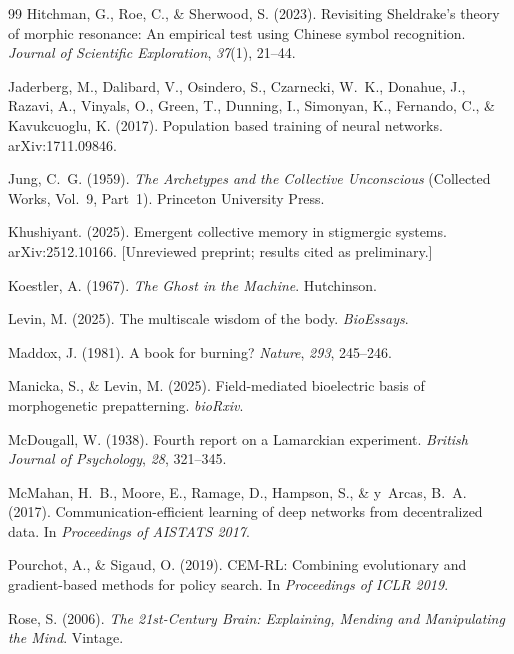 \documentclass[twoside,11pt]{article}
\begin{document}
\begin{thebibliography}{99}
Hitchman, G., Roe, C., \& Sherwood, S. (2023).
Revisiting Sheldrake's theory of morphic resonance: An empirical test using
Chinese symbol recognition.
\textit{Journal of Scientific Exploration}, \textit{37}(1), 21--44.

Jaderberg, M., Dalibard, V., Osindero, S., Czarnecki, W.~K., Donahue, J.,
Razavi, A., Vinyals, O., Green, T., Dunning, I., Simonyan, K., Fernando, C.,
\& Kavukcuoglu, K. (2017).
Population based training of neural networks.
arXiv:1711.09846.

Jung, C.~G. (1959).
\textit{The Archetypes and the Collective Unconscious}
(Collected Works, Vol.~9, Part~1).
Princeton University Press.

Khushiyant. (2025).
Emergent collective memory in stigmergic systems.
arXiv:2512.10166. [Unreviewed preprint; results cited as preliminary.]

Koestler, A. (1967).
\textit{The Ghost in the Machine}.
Hutchinson.

Levin, M. (2025).
The multiscale wisdom of the body.
\textit{BioEssays}.

Maddox, J. (1981).
A book for burning?
\textit{Nature}, \textit{293}, 245--246.

Manicka, S., \& Levin, M. (2025).
Field-mediated bioelectric basis of morphogenetic prepatterning.
\textit{bioRxiv}.

McDougall, W. (1938).
Fourth report on a Lamarckian experiment.
\textit{British Journal of Psychology}, \textit{28}, 321--345.

McMahan, H.~B., Moore, E., Ramage, D., Hampson, S., \& y~Arcas, B.~A. (2017).
Communication-efficient learning of deep networks from decentralized data.
In \textit{Proceedings of AISTATS 2017}.

Pourchot, A., \& Sigaud, O. (2019).
CEM-RL: Combining evolutionary and gradient-based methods for policy search.
In \textit{Proceedings of ICLR 2019}.

Rose, S. (2006).
\textit{The 21st-Century Brain: Explaining, Mending and Manipulating the Mind}.
Vintage.


\end{thebibliography}
\end{document}
